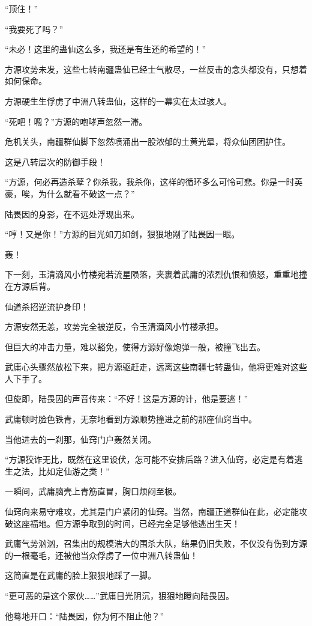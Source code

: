 \begin{this_body}
“顶住！”

“我要死了吗？”

“未必！这里的蛊仙这么多，我还是有生还的希望的！”

方源攻势未发，这些七转南疆蛊仙已经士气散尽，一丝反击的念头都没有，只想着如何保命。

方源硬生生俘虏了中洲八转蛊仙，这样的一幕实在太过骇人。

“死吧！嗯？”方源的咆哮声忽然一滞。

危机关头，南疆群仙脚下忽然喷涌出一股浓郁的土黄光晕，将众仙团团护住。

这是八转层次的防御手段！

“方源，何必再造杀孽？你杀我，我杀你，这样的循环多么可怜可悲。你是一时英豪，唉，为什么就看不破这一点？”

陆畏因的身影，在不远处浮现出来。

“哼！又是你！”方源的目光如刀如剑，狠狠地剐了陆畏因一眼。

轰！

下一刻，玉清滴风小竹楼宛若流星陨落，夹裹着武庸的浓烈仇恨和愤怒，重重地撞在方源后背。

仙道杀招逆流护身印！

方源安然无恙，攻势完全被逆反，令玉清滴风小竹楼承担。

但巨大的冲击力量，难以豁免，使得方源好像炮弹一般，被撞飞出去。

武庸心头骤然放松下来，把方源驱赶走，远离这些南疆七转蛊仙，他将更难对这些人下手了。

但旋即，陆畏因的声音传来：“不好！这是方源的计，他是要逃！”

武庸顿时脸色铁青，无奈地看到方源顺势撞进之前的那座仙窍当中。

当他进去的一刹那，仙窍门户轰然关闭。

“方源狡诈无比，既然在这里设伏，怎可能不安排后路？进入仙窍，必定是有着逃生之法，比如定仙游之类！”

一瞬间，武庸脑壳上青筋直冒，胸口烦闷至极。

仙窍向来易守难攻，尤其是门户紧闭的仙窍。当然，南疆正道群仙在此，必定能攻破这座福地。但方源争取到的时间，已经完全足够他逃出生天！

武庸气势汹汹，召集出的规模浩大的围杀大队，结果仍旧失败，不仅没有伤到方源的一根毫毛，还被他当众俘虏了一位中洲八转蛊仙！

这简直是在武庸的脸上狠狠地踩了一脚。

“更可恶的是这个家伙……”武庸目光阴沉，狠狠地瞪向陆畏因。

他蓦地开口：“陆畏因，你为何不阻止他？”


\end{this_body}
